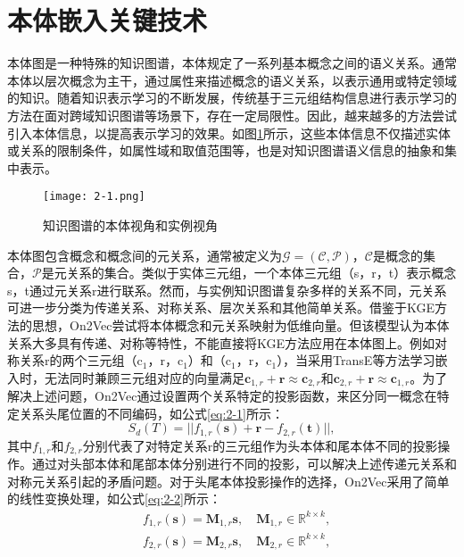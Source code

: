 \section{本体嵌入关键技术}
本体图是一种特殊的知识图谱，本体规定了一系列基本概念之间的语义关系。通常本体以层次概念为主干，通过属性来描述概念的语义关系，以表示通用或特定领域的知识。随着知识表示学习的不断发展，传统基于三元组结构信息进行表示学习的方法在面对跨域知识图谱等场景下，存在一定局限性。因此，越来越多的方法尝试引入本体信息，以提高表示学习的效果。如图\ref{fig:2-1}所示，这些本体信息不仅描述实体或关系的限制条件，如属性域和取值范围等，也是对知识图谱语义信息的抽象和集中表示。
\begin{figure}[h]
  \centering
  \texttt{[image: 2-1.png]}
  \caption{知识图谱的本体视角和实例视角}
  \label{fig:2-1}
\end{figure}

本体图包含概念和概念间的元关系，通常被定义为\(\mathcal{G} = (\mathcal{C},\mathcal{P})\)，\(\mathcal{C}\)是概念的集合，\(\mathcal{P}\)是元关系的集合。类似于实体三元组，一个本体三元组（s，r，t）表示概念s，t通过元关系r进行联系。然而，与实例知识图谱复杂多样的关系不同，元关系可进一步分类为传递关系、对称关系、层次关系和其他简单关系\cite{chen2018on2vec}。借鉴于KGE方法的思想，On2Vec\cite{chen2018on2vec}尝试将本体概念和元关系映射为低维向量。但该模型认为本体关系大多具有传递、对称等特性，不能直接将KGE方法应用在本体图上。例如对称关系r的两个三元组（c$_{1}$，r，c$_{1}$）和（c$_{1}$，r，c$_{1}$），当采用TransE等方法学习嵌入时，无法同时兼顾三元组对应的向量满足\(\textbf{c}_{1,r} + \textbf{r} ≈ \textbf{c}_{2,r}\)和\(\textbf{c}_{2,r} + \textbf{r} ≈ \textbf{c}_{1,r}\)。为了解决上述问题，On2Vec通过设置两个关系特定的投影函数，来区分同一概念在特定关系头尾位置的不同编码，如公式\ref{eq:2-1}所示：
\begin{equation}
  S_{d}(T) = || f_{1,r}(\textbf{s}) + \textbf{r} -f_{2,r}(\textbf{t})||,\label{eq:2-1}
\end{equation}
其中\(f_{1,r}\)和\(f_{2,r}\)分别代表了对特定关系r的三元组作为头本体和尾本体不同的投影操作。通过对头部本体和尾部本体分别进行不同的投影，可以解决上述传递元关系和对称元关系引起的矛盾问题。对于头尾本体投影操作的选择，On2Vec采用了简单的线性变换处理，如公式\ref{eq:2-2}所示：
\begin{equation}
  \begin{aligned} 
    &f_{1,r}(\textbf{s}) = \textbf{M}_{1,r}\textbf{s}, \quad\textbf{M}_{1,r} \in \mathbb{R}^{k \times k}, \\
    &f_{2,r}(\textbf{s}) = \textbf{M}_{2,r}\textbf{s}, \quad\textbf{M}_{2,r} \in \mathbb{R}^{k \times k},
    \end{aligned} \label{eq:2-2}
\end{equation}

